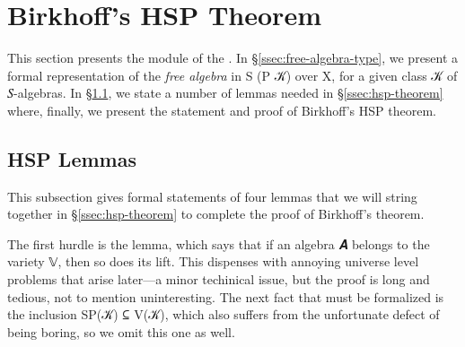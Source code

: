 \documentclass[a4paper,UKenglish,cleveref,autoref,thm-restate]{lipics-v2021}
\begin{document}
\section{Birkhoff's HSP Theorem}\label{sec:birkhoff}
This section presents the \ualibBirkhoff module of  the \agdaualib. In \S\ref{ssec:free-algebra-type}, we present a formal representation of the \emph{free algebra} in \ad S (\ad P \ab 𝒦) over \ab X, for a given class \ab 𝒦 of \ab 𝑆-algebras. In \S\ref{ssec:hsp-lemmas}, we state a number of lemmas needed in \S\ref{ssec:hsp-theorem} where, finally, we present the statement and proof of Birkhoff's HSP theorem.


\subsection{HSP Lemmas}\label{ssec:hsp-lemmas}
This subsection gives formal statements of four lemmas that we will string together in \S\ref{ssec:hsp-theorem} to complete the proof of Birkhoff's theorem.

The first hurdle is the  lemma, which says that if an algebra \ab 𝑨 belongs to the variety 𝕍, then so does its lift. This dispenses with annoying universe level problems that arise later---a minor techinical issue, but the proof is long and tedious, not to mention uninteresting. \seedocfordetails
The next fact that must be formalized is the inclusion \ad S\ad P(\ab 𝒦) \af ⊆ \ad V(\ab 𝒦), which also suffers from the unfortunate defect of being boring, so we omit this one as well.
\end{document}
